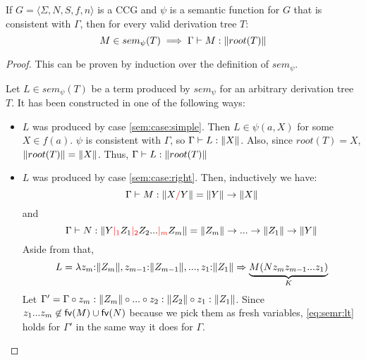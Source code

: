 \documentclass[main.tex]{subfiles}
\begin{document}
\begin{prop}
    \label{ccg:typeconsistent}
    If $ G = \langle \Sigma, N, S, f, n \rangle $ is a CCG and $\psi$ is a
    semantic function for $G$ that is consistent with $\Gamma$, then
    for every valid derivation tree $T$:
    \[
        M \in sem_{\psi}(T) \implies \Gamma \vdash M : \|root(T)\|
    \]
\end{prop}
\begin{proof}
    This can be proven by induction over the definition of $sem_{\psi}$.

    Let $L \in sem_{\psi}(T)$ be a term produced by $sem_{\psi}$ for an
    arbitrary derivation tree $T$. It has been constructed in one of the
    following ways:
    \begin{itemize}
        \item $L$ was produced by case \ref{sem:case:simple}. Then
            $L \in \psi(a, X)$ for some $X \in f(a)$. $\psi$
            is consistent with $\Gamma$, so $\Gamma \vdash L: \|X\|$. Also, since
            $root(T) = X$, $\|root(T)\| = \|X\|$. Thus,
            $\Gamma \vdash L: \|root(T)\|$
        \item $L$ was produced by case \ref{sem:case:right}. Then,
            inductively we have:
            \begin{equation}
                \label{eq:semr:lt}
                \Gamma \vdash M : \|X \textcolor{red}{/} Y\| = \|Y\| \rightarrow \|X\|
            \end{equation}
            and
            \begin{equation}
            \label{eq:semr:rt}
                \Gamma \vdash N : \|Y \textcolor{red}{|_{1}} Z_1 \textcolor{red}{|_{2}} Z_2 ... \textcolor{red}{|_{m}} Z_m\|
                = \|Z_m\| \rightarrow ... \rightarrow \|Z_1\| \rightarrow \|Y\|
            \end{equation}
            Aside from that,
            \begin{equation}
                L = \lambda z_m {:} \|Z_m\|, z_{m - 1} {:} \|Z_{m - 1}\|, ..., z_1 {:} \|Z_1\| \Rightarrow
                \underbrace{M ( N z_m z_{m - 1} ... z_1 )}_{K}
            \end{equation}
            Let $\Gamma' = \Gamma \circ z_m : \|Z_m\| \circ ... \circ
                           z_2 : \|Z_2\| \circ z_1 : \|Z_1\|$.
            Since $z_1 ... z_m \not\in \mathsf{fv}(M) \cup \mathsf{fv}(N)$ because we pick them
            as fresh variables, \cref{eq:semr:lt} holds for $\Gamma'$ in the
            same way it does for $\Gamma$.


\end{itemize}
\end{proof}
\end{document}
